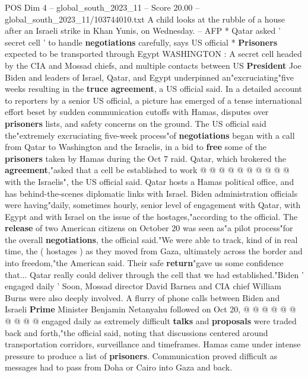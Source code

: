 \begin{textsample}{POS Dim 4 – global\_south\_2023\_11 – Score 20.00 – global\_south\_2023\_11/103744010.txt}  \label{ex:f4_pos_153}
A child looks at the rubble of a house after an Israeli strike in Khan Yunis, on Wednesday. -- AFP * Qatar asked ' secret cell ' to handle \textbf{negotiations} carefully, says US official * \textbf{Prisoners} expected to be transported through Egypt WASHINGTON : A secret cell headed by the CIA and Mossad chiefs, and multiple contacts between US \textbf{President} Joe Biden and leaders of Israel, Qatar, and Egypt underpinned an"excruciating"five weeks resulting in the \textbf{truce} \textbf{agreement}, a US official said.
In a detailed account to reporters by a senior US official, a picture has emerged of a tense international effort beset by sudden communication cutoffs with Hamas, disputes over \textbf{prisoners} lists, and safety concerns on the ground.
The US official said the"extremely excruciating five-week process"of \textbf{negotiations} began with a call from Qatar to Washington and the Israelis, in a bid to \textbf{free} some of the \textbf{prisoners} taken by Hamas during the Oct 7 raid.
Qatar, which brokered the \textbf{agreement},"asked that a cell be established to work @ @ @ @ @ @ @ @ @ @ with the Israelis", the US official said.
Qatar hosts a Hamas political office, and has behind-the-scenes diplomatic links with Israel.
Biden administration officials were having"daily, sometimes hourly, senior level of engagement with Qatar, with Egypt and with Israel on the issue of the hostages,"according to the official.
The \textbf{release} of two American citizens on October 20 was seen as"a pilot process"for the overall \textbf{negotiations}, the official said."We were able to track, kind of in real time, the ( hostages ) as they moved from Gaza, ultimately across the border and into freedom,"the American said.
Their safe \textbf{return}"gave us some confidence that...
Qatar really could deliver through the cell that we had established."Biden ' engaged daily ' Soon, Mossad director David Barnea and CIA chief William Burns were also deeply involved.
A flurry of phone calls between Biden and Israeli \textbf{Prime} Minister Benjamin Netanyahu followed on Oct 20, @ @ @ @ @ @ @ @ @ @ engaged daily as extremely difficult \textbf{talks} and \textbf{proposals} were traded back and forth,"the official said, noting that discussions centered around transportation corridors, surveillance and timeframes.
Hamas came under intense pressure to produce a list of \textbf{prisoners}.
Communication proved difficult as messages had to pass from Doha or Cairo into Gaza and back.

\end{textsample}

